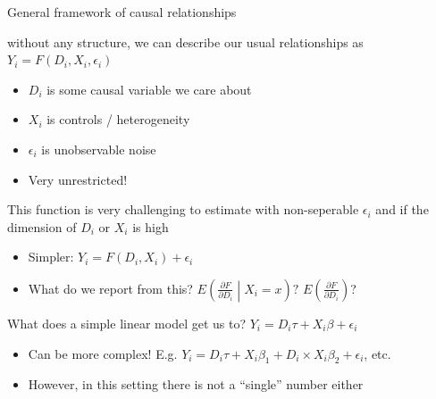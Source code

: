 \documentclass[notes,11pt, aspectratio=169]{beamer}
\newenvironment{wideitemize}{\itemize\addtolength{\itemsep}{10pt}}{\enditemize}
\begin{document}
\begin{frame}{General framework of causal relationships}
  \begin{wideitemize}
  \item without any structure, we can describe our usual relationships
    as $Y_{i} = F(D_{i}, X_{i},\epsilon_{i})$
    \begin{itemize}
    \item $D_{i}$ is some causal variable we care about
    \item $X_{i}$ is controls / heterogeneity
    \item $\epsilon_{i}$ is unobservable noise
    \item Very unrestricted!
    \end{itemize}
  \item This function is very challenging to estimate with
    non-seperable $\epsilon_{i}$ and if the dimension of $D_{i}$ or
    $X_{i}$ is high
    \begin{itemize}
    \item Simpler: $Y_{i} = F(D_{i}, X_{i}) + \epsilon_{i}$
    \item What do we report from this? $E\left(\frac{\partial{F}}{\partial D_{i}} \middle| X_{i} = x\right)?$ $E\left(\frac{\partial{F}}{\partial D_{i}} \right)$?
    \end{itemize}
  \item What does a simple linear model get us to? $Y_{i} = D_{i}\tau + X_{i}\beta + \epsilon_{i}$
    \begin{itemize}
    \item Can be more complex! E.g.
      $Y_{i} = D_{i}\tau + X_{i}\beta_{1} + D_{i} \times
      X_{i}\beta_{2} + \epsilon_{i}$, etc.
    \item However, in this setting there is not a ``single'' number
      either
    \end{itemize}
  \end{wideitemize}
\end{frame}
\end{document}
